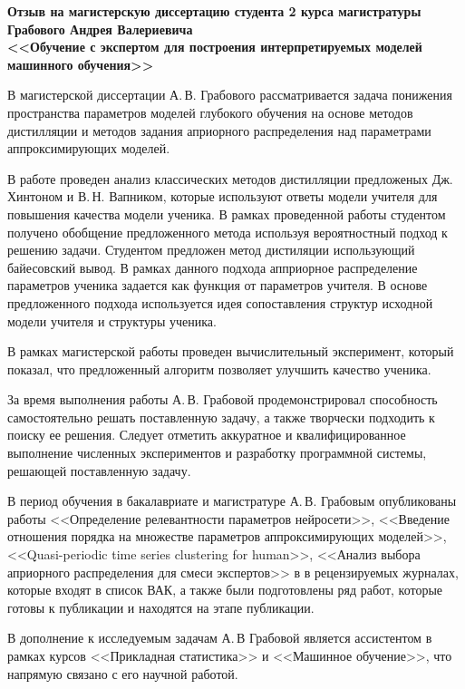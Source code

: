 \documentclass[12pt]{article}
\begin{document}
\thispagestyle{empty}
\begin{center}
\bigskip

\textbf{Отзыв на магистерскую диссертацию студента 2 курса магистратуры\\
Грабового Андрея Валериевича\\
<<Обучение с экспертом для построения интерпретируемых моделей машинного обучения>>}
\end{center}

В магистерской диссертации А.\,В. Грабового рассматривается задача понижения пространства параметров моделей глубокого обучения на основе методов дистилляции и методов задания априорного распределения над параметрами аппроксимирующих моделей.

В работе проведен анализ классических методов дистилляции предложеных Дж. Хинтоном и В.\,Н. Вапником, которые используют ответы модели учителя для повышения качества модели ученика.
В рамках проведенной работы студентом получено обобщение предложенного метода используя вероятностный подход к решению задачи.
Студентом предложен метод дистиляции использующий байесовский вывод. В рамках данного подхода апприорное распределение параметров ученика задается как функция от параметров учителя. В основе предложенного подхода используется идея сопоставления структур исходной модели учителя и структуры ученика. 

В рамках магистерской работы проведен вычислительный эксперимент, который показал, что предложенный алгоритм  позволяет улучшить качество ученика.

За время выполнения работы А.\,В. Грабовой продемонстрировал способность самостоятельно решать поставленную задачу, а также творчески подходить к поиску ее решения. Следует отметить аккуратное и квалифицированное выполнение численных экспериментов и разработку программной системы, решающей поставленную задачу.

В период обучения в бакалавриате и магистратуре А.\,В. Грабовым опубликованы работы <<Определение релевантности параметров нейросети>>, <<Введение отношения порядка на множестве параметров аппроксимирующих моделей>>, <<Quasi-periodic time series clustering for human>>, <<Анализ выбора априорного распределения для смеси экспертов>> в  в рецензируемых журналах, которые входят в список ВАК, а также были подготовлены ряд работ, которые готовы к публикации и находятся на этапе публикации.

В дополнение к исследуемым задачам А.\,В Грабовой является ассистентом в рамках курсов <<Прикладная статистика>> и <<Машинное обучение>>, что напрямую связано с его научной работой.
\end{document}
